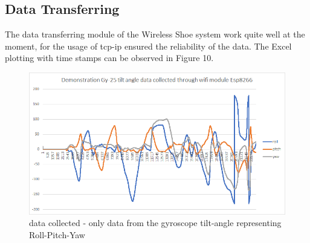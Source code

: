 \documentclass[12pt,a4paper]{article}
\begin{document}
\subsection{Data Transferring}
The data transferring module of the Wireless Shoe system work quite well at the moment, for the usage of tcp-ip ensured the reliability of the data. The Excel plotting with time stamps can be observed in Figure 10.
\begin{figure}
\begin{center}
\includegraphics[scale=1]{Gy25}
\caption{data collected - only data from the gyroscope tilt-angle representing Roll-Pitch-Yaw}
\end{center}
\end{figure} 
\end{document}
